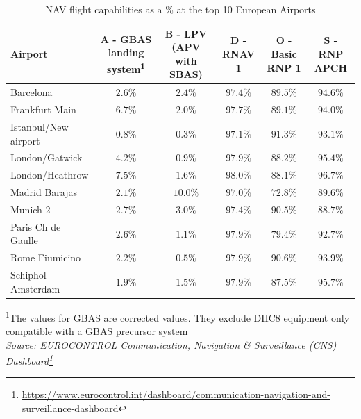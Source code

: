 \documentclass[
  11pt,
  a4paper,
]{book}
\DeclareRobustCommand{\href}[2]{#2\footnote{\url{#1}}}
\begin{document}
\hypertarget{tbl-nav-flight_top10}{}
\setlength{\LTpost}{0mm}
\begin{longtable}{lccccc}
\caption{\label{tbl-nav-flight_top10}NAV flight capabilities as a \% at the top 10 European Airports }\tabularnewline

\toprule
Airport & A - GBAS landing system\textsuperscript{1} & B - LPV (APV with SBAS) & D - RNAV 1 & O - Basic RNP 1 & S - RNP APCH \\ 
\midrule
Barcelona & $2.6\%$ & $2.4\%$ & $97.4\%$ & $89.5\%$ & $94.6\%$ \\ 
Frankfurt Main & $6.7\%$ & $2.0\%$ & $97.7\%$ & $89.1\%$ & $94.0\%$ \\ 
Istanbul/New airport & $0.8\%$ & $0.3\%$ & $97.1\%$ & $91.3\%$ & $93.1\%$ \\ 
London/Gatwick & $4.2\%$ & $0.9\%$ & $97.9\%$ & $88.2\%$ & $95.4\%$ \\ 
London/Heathrow & $7.5\%$ & $1.6\%$ & $98.0\%$ & $88.1\%$ & $96.7\%$ \\ 
Madrid Barajas & $2.1\%$ & $10.0\%$ & $97.0\%$ & $72.8\%$ & $89.6\%$ \\ 
Munich 2 & $2.7\%$ & $3.0\%$ & $97.4\%$ & $90.5\%$ & $88.7\%$ \\ 
Paris Ch de Gaulle & $2.6\%$ & $1.1\%$ & $97.9\%$ & $79.4\%$ & $92.7\%$ \\ 
Rome Fiumicino & $2.2\%$ & $0.5\%$ & $97.9\%$ & $90.6\%$ & $93.9\%$ \\ 
Schiphol Amsterdam & $1.9\%$ & $1.5\%$ & $97.9\%$ & $87.5\%$ & $95.7\%$ \\ 
\bottomrule
\end{longtable}
\begin{minipage}{\linewidth}
\textsuperscript{1}The values for GBAS are corrected values. They exclude DHC8 equipment only compatible with a GBAS precursor system\\
\emph{Source: \href{https://www.eurocontrol.int/dashboard/communication-navigation-and-surveillance-dashboard}{EUROCONTROL Communication, Navigation \& Surveillance (CNS) Dashboard}}\\
\end{minipage}
\end{document}
